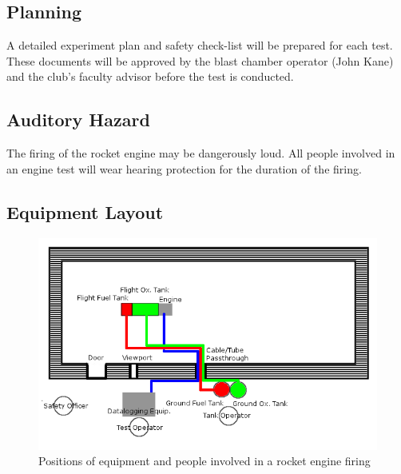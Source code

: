 \documentclass{article}
\begin{document}
\subsection{Planning}
A detailed experiment plan and safety check-list will be prepared for each test. These documents will be approved by the blast chamber operator (John Kane) and the club's faculty advisor before the test is conducted.
\subsection{Auditory Hazard}
The firing of the rocket engine may be dangerously loud. All people involved in an engine test will wear hearing protection for the duration of the firing.
\subsection{Equipment Layout}
\begin{figure}[h!]
\centering
\includegraphics[width = \textwidth]{blast_chamber_layout.png}
\caption{Positions of equipment and people involved in a rocket engine firing} 
\label{layout}
\end{figure}
\end{document}
